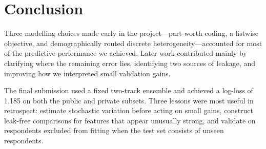 \documentclass[11pt]{article}
\begin{document}
\section{Conclusion}\label{sec:conc}

Three modelling choices made early in the project---part-worth coding, a listwise
objective, and demographically routed discrete heterogeneity---accounted for most of the
predictive performance we achieved. Later work contributed mainly by clarifying where the
remaining error lies, identifying two sources of leakage, and improving how we interpreted
small validation gains.

The final submission used a fixed two-track ensemble and achieved a log-loss of 1.185 on
both the public and private subsets. Three lessons were most useful in retrospect:
estimate stochastic variation before acting on small gains, construct leak-free comparisons
for features that appear unusually strong, and validate on respondents excluded from
fitting when the test set consists of unseen respondents.
\end{document}
